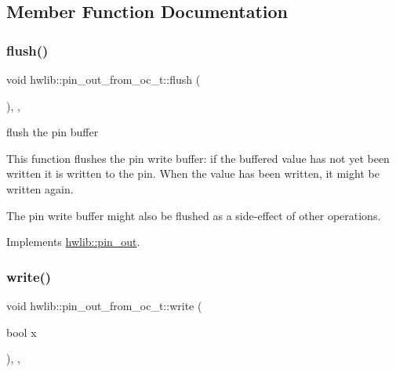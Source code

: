 \subsection{Member Function Documentation}
\mbox{\label{classhwlib_1_1pin__out__from__oc__t_ae233e9c1b5f91ab242ca3611422de19c}} 
\subsubsection{\texorpdfstring{flush()}{flush()}}
{\footnotesize\ttfamily void hwlib\+::pin\+\_\+out\+\_\+from\+\_\+oc\+\_\+t\+::flush (\begin{DoxyParamCaption}{ }\end{DoxyParamCaption})\hspace{0.3cm}{\ttfamily [inline]}, {\ttfamily [override]}, {\ttfamily [virtual]}}





flush the pin buffer

This function flushes the pin write buffer\+: if the buffered value has not yet been written it is written to the pin. When the value has been written, it might be written again.

The pin write buffer might also be flushed as a side-\/effect of other operations. 

Implements \hyperlink{classhwlib_1_1pin__out_ac22910317477a52431a44e7e3c66fc57}{hwlib\+::pin\+\_\+out}.

\mbox{\label{classhwlib_1_1pin__out__from__oc__t_afdf1cb4bb1f50aa735986af3b0e49d01}} 
\subsubsection{\texorpdfstring{write()}{write()}}
{\footnotesize\ttfamily void hwlib\+::pin\+\_\+out\+\_\+from\+\_\+oc\+\_\+t\+::write (\begin{DoxyParamCaption}\item[{bool}]{x }\end{DoxyParamCaption})\hspace{0.3cm}{\ttfamily [inline]}, {\ttfamily [override]}, {\ttfamily [virtual]}}





